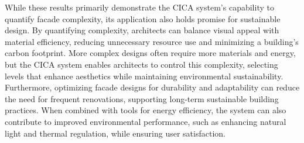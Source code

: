 While these results primarily demonstrate the CICA system's capability to quantify facade complexity, its application also holds promise for sustainable design.
By quantifying complexity, architects can balance visual appeal with material efficiency, reducing unnecessary resource use and minimizing a building’s carbon footprint.
More complex designs often require more materials and energy, but the CICA system enables architects to control this complexity, selecting levels that enhance aesthetics while maintaining environmental sustainability.
Furthermore, optimizing facade designs for durability and adaptability can reduce the need for frequent renovations, supporting long-term sustainable building practices.
When combined with tools for energy efficiency, the system can also contribute to improved environmental performance, such as enhancing natural light and thermal regulation, while ensuring user satisfaction.




